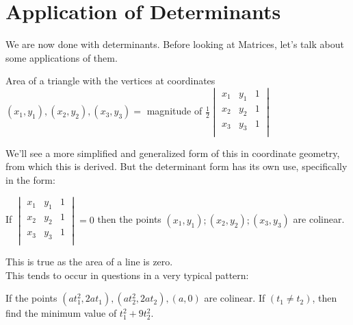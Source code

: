 \section{Application of Determinants}
We are now done with determinants. Before looking at Matrices, let's talk about some applications of them.\\
\begin{theorem}
    Area of a triangle with the vertices at coordinates $(x_1,y_1),(x_2,y_2),(x_3,y_3) =$ magnitude of $\frac{1}{2} \begin{vmatrix}
        x_1 & y_1 & 1\\
        x_2 & y_2 & 1\\
        x_3 & y_3 & 1\\
    \end{vmatrix}$
\end{theorem}
We'll see a more simplified and generalized form of this in coordinate geometry, from which this is derived. But the determinant form has its own use, specifically in the form:\\
\begin{theorem}
    If $\begin{vmatrix}
        x_1 & y_1 & 1\\
        x_2 & y_2 & 1\\
        x_3 & y_3 & 1\\
    \end{vmatrix}=0$ then the points $(x_1,y_1);(x_2,y_2);(x_3,y_3)$ are colinear.
\end{theorem}
This is true as the area of a line is zero.\\
This tends to occur in questions in a very typical pattern:\\
\begin{example}
    If the points $(at^2_1, 2at_1), (at^2_2, 2at_2), (a, 0)$ are colinear. If $(t_1 \neq t_2)$, then find the minimum value of $t^2_1+9t^2_2$.
\end{example}

